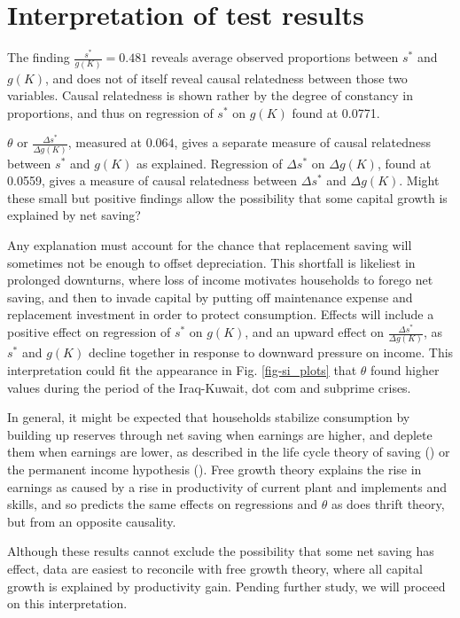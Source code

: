 \documentclass[a4paper,fleqn]{latex_styles/cas-sc}
\begin{document}
\section{Interpretation of test results\label{interpretation-of-test-results}}


The finding \(\frac{s^*}{g(K)} = 0.481\) reveals average observed proportions between \(s^*\) and \(g(K)\), and does not of itself reveal causal relatedness between those two variables. Causal relatedness is shown rather by the degree of constancy in proportions, and thus on regression of \(s^*\) on \(g(K)\) found at 0.0771.

\(\theta\) or \(\frac{\Delta s^*}{\Delta g(K)}\), measured at \(0.064\), gives a separate measure of causal relatedness between \(s^*\) and \(g(K)\) as explained. Regression of \(\Delta s^*\) on \(\Delta g(K)\), found at 0.0559, gives a measure of causal relatedness between \(\Delta s^*\) and \(\Delta g(K)\). Might these small but positive findings allow the possibility that some capital growth is explained by net saving?

Any explanation must account for the chance that replacement saving will sometimes not be enough to offset depreciation. This shortfall is likeliest in prolonged downturns, where loss of income motivates households to forego net saving, and then to invade capital by putting off maintenance expense and replacement investment in order to protect consumption. Effects will include a positive effect on regression of \(s^*\) on \(g(K)\), and an upward effect on \(\frac{\Delta s^*}{\Delta g(K)}\), as \(s^*\) and \(g(K)\) decline together in response to downward pressure on income. This interpretation could fit the appearance in Fig. \ref{fig-si_plots} that \(\theta\) found higher values during the period of the Iraq-Kuwait, dot com and subprime crises.

In general, it might be expected that households stabilize consumption by building up reserves through net saving when earnings are higher, and deplete them when earnings are lower, as described in the life cycle theory of saving (\cite{modigliani1954utility}) or the permanent income hypothesis (\cite{friedman1957permanent}). Free growth theory explains the rise in earnings as caused by a rise in productivity of current plant and implements and skills, and so predicts the same effects on regressions and \(\theta\) as does thrift theory, but from an opposite causality.

Although these results cannot exclude the possibility that some net saving has effect, data are easiest to reconcile with free growth theory, where all capital growth is explained by productivity gain. Pending further study, we will proceed on this interpretation.
\end{document}
